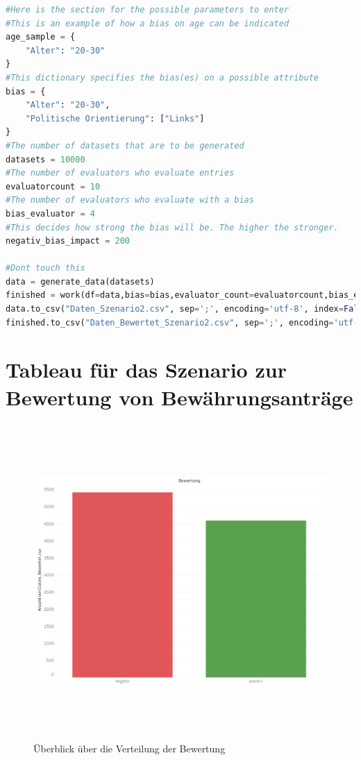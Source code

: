 \documentclass[a4paper,12pt]{report}
\begin{document}
\begin{lstlisting}[language=Python,label={lst:Sz2Z8},caption=Achte Zelle für die Interaktion der benutzenden Person]
#Here is the section for the possible parameters to enter
#This is an example of how a bias on age can be indicated
age_sample = {
    "Alter": "20-30"
}
#This dictionary specifies the bias(es) on a possible attribute
bias = {
    "Alter": "20-30",
    "Politische Orientierung": ["Links"]
}
#The number of datasets that are to be generated
datasets = 10000
#The number of evaluators who evaluate entries
evaluatorcount = 10
#The number of evaluators who evaluate with a bias
bias_evaluator = 4
#This decides how strong the bias will be. The higher the stronger.
negativ_bias_impact = 200

#Dont touch this
data = generate_data(datasets)
finished = work(df=data,bias=bias,evaluator_count=evaluatorcount,bias_evaluator=bias_evaluator,bias_neg=negativ_bias_impact)
data.to_csv("Daten_Szenario2.csv", sep=';', encoding='utf-8', index=False)
finished.to_csv("Daten_Bewertet_Szenario2.csv", sep=';', encoding='utf-8', index=False)      
\end{lstlisting}

    \chapter{Tableau für das Szenario zur Bewertung von Bewährungsanträge}

\begin{figure}[!h]
    \centering
    \includegraphics[width=16cm,height=12cm]{Diagramme/SZ1_Tab1.PNG}
    \caption{Überblick über die Verteilung der Bewertung}
    \label{fig:SZ1Tab1}
\end{figure}
\end{document}
